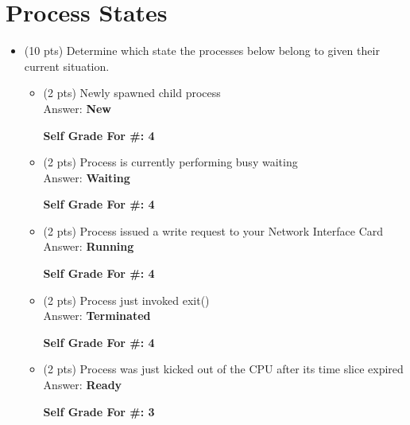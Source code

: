 \documentclass[conference]{IEEEtran}
\begin{document}
\section{Process States}
\begin{itemize}
	\item (10 pts) Determine which state the processes below belong to given their current
	situation.
	\begin{itemize} 
		\item (2 pts) Newly spawned child process \\
		Answer: \textbf{New}
		\begin{center}
			\textbf{Self Grade For \#: 4}
		\end{center}
	 
		\item (2 pts) Process is currently performing busy waiting \\
		Answer: \textbf{Waiting}
		\begin{center}
			\textbf{Self Grade For \#: 4}
		\end{center}
	
		\item (2 pts) Process issued a write request to your Network Interface Card \\
		Answer: \textbf{Running}
		\begin{center}
			\textbf{Self Grade For \#: 4}
		\end{center}
	
		\item (2 pts) Process just invoked exit() \\
		Answer: \textbf{Terminated}
		\begin{center}
		\textbf{Self Grade For \#: 4}
		\end{center}
	
		\item (2 pts) Process was just kicked out of the CPU after its time slice expired \\
		Answer: \textbf{Ready}
		\begin{center}
		\textbf{Self Grade For \#: 3}
		\end{center}

	
		
	\end{itemize}
\end{itemize}

\printbibliography
\end{document}
